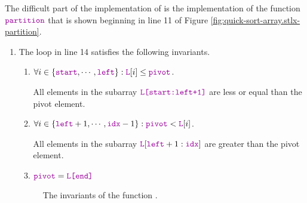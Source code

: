\noindent
The difficult part of the implementation of  is the implementation of the
function $\mytt{partition}$ that is shown beginning in line 11 of Figure \ref{fig:quick-sort-array.stlx-partition}.
\begin{enumerate}
\item
      The  loop in line 14 satisfies the following invariants.
      \begin{enumerate}
      \item $\forall i \in \{ \mytt{start}, \cdots, \mytt{left} \} : \mytt{L}[i] \leq \mytt{pivot}$.

            All elements in the subarray $\mytt{L[start:left+1]}$ are less or equal than the pivot element.
      \item $\forall i \in \{ \mytt{left}+1,\cdots,\mytt{idx}-1\}:\mytt{pivot} < \mytt{L}[i]$.

            All elements in the subarray $\mytt{L}[\mytt{left}+1:\mytt{idx}]$ are greater than the pivot
            element.
      \item $\mytt{pivot} = \mytt{L[end]}$
      \end{enumerate}

\begin{figure}[!ht]
  \centering
  \caption{The invariants of the function .}
  \label{fig:lomuto.png}
\end{figure}



\end{enumerate}
